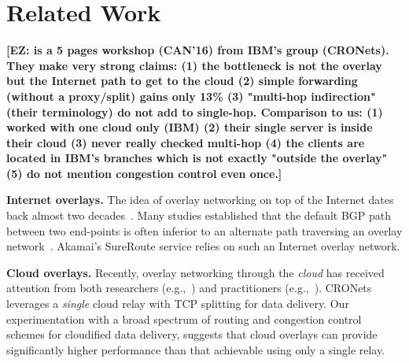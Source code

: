 \documentclass{hotnets17}
\newcommand{\mycomm}[3]{{\color{#2} \textbf{[#1: #3]}}}
\newcommand{\mycomm}[3]{}
\newcommand{\IK}[1]{\mycomm{IK}{blue}{#1}}
\newcommand{\EZ}[1]{\mycomm{EZ}{BlueGreen}{#1}}
\newcommand{\T}[1]{\smallskip\noindent\textbf{#1}} %
\begin{document}


\section{Related Work}

\EZ{\cite{le2016understanding} is a 5 pages workshop (CAN'16) from IBM's group (CRONets). 
They make very strong claims: (1) the bottleneck is not the overlay but the Internet path to get to the cloud (2) simple forwarding (without a proxy/split) gains only 13\% (3) "multi-hop indirection" (their terminology) do not add to single-hop.
Comparison to us: (1) worked with one cloud only (IBM) (2) their single server is inside their cloud (3) never really checked multi-hop (4) the clients are located in IBM's branches which is not exactly "outside the overlay" (5) do not mention congestion control even once.}

\T{Internet overlays.} The idea of overlay networking on top of the Internet dates back almost two decades~\cite{old-overlay-1, old-overlay-2, RON}. Many studies established that the default BGP path between two end-points is often inferior to an alternate path traversing an overlay network~\cite{old-overlay-1, old-overlay-2, RON, akamai-2, akamai-3, akamai-4}. Akamai's SureRoute service relies on such an Internet overlay network.

\T{Cloud overlays.} Recently, overlay networking through the \emph{cloud} has received attention from both researchers (e.g.,~\cite{CRONets}) and practitioners (e.g.,~\cite{teridion}). CRONets~\cite{CRONets} leverages a \emph{single} cloud relay with TCP splitting for data delivery. Our experimentation with a broad spectrum of routing and congestion control schemes for cloudified data delivery, suggests that cloud overlays can provide significantly higher performance than that achievable using only a single relay.
\end{document}
